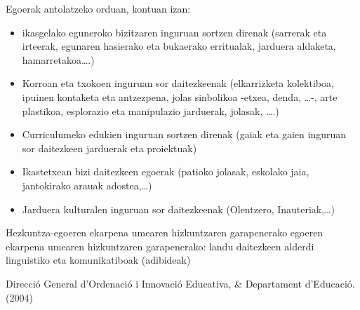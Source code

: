 \documentclass[
]{book}
\providecommand{\tightlist}{%
  \setlength{\itemsep}{0pt}\setlength{\parskip}{0pt}}
\begin{document}
Egoerak antolatzeko orduan, kontuan izan:

\begin{itemize}
\tightlist
\item
  ikasgelako eguneroko bizitzaren inguruan sortzen direnak (sarrerak eta irteerak, egunaren hasierako eta bukaerako erritualak, jarduera aldaketa, hamarretakoa\ldots.)
\item
  Korroan eta txokoen inguruan sor daitezkeenak (elkarrizketa kolektiboa, ipuinen kontaketa eta antzezpena, jolas sinbolikoa -etxea, denda, \ldots-, arte plastikoa, esplorazio eta manipulazio jarduerak, jolasak, \ldots.)
\item
  Curriculumeko edukien inguruan sortzen direnak (gaiak eta gaien inguruan sor
  daitezkeen jarduerak eta proiektuak)
\item
  Ikastetxean bizi daitezkeen egoerak (patioko jolasak, eskolako jaia, jantokirako arauak adostea,\ldots)
\item
  Jarduera kulturalen inguruan sor daitezkeenak (Olentzero, Inauteriak,\ldots)
\end{itemize}

Hezkuntza-egoeren ekarpena umearen hizkuntzaren garapenerako egoeren ekarpena umearen hizkuntzaren garapenerako: landu daitezkeen alderdi linguistiko eta komunikatiboak (adibideak)

Direcció General d'Ordenació i Innovació Educativa, \& Departament d'Educació. (2004)
\end{document}
